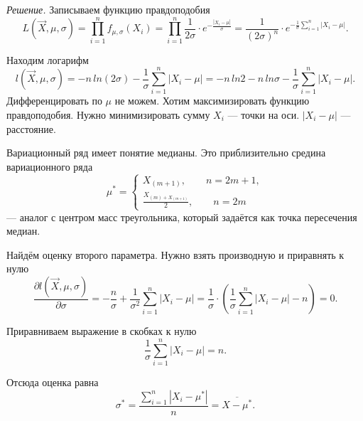 \textit{Решение.} Записываем функцию правдоподобия
$$L \left( \vec{X}, \mu, \sigma \right) =
  \prod \limits_{i = 1}^n f_{ \mu, \sigma } \left( X_i \right) =
  \prod \limits_{i = 1}^n
    \frac{1}{2 \sigma } \cdot e^{- \frac{ \left| X_i - \mu \right| }{ \sigma }} =
  \frac{1}{ \left( 2 \sigma \right)^n} \cdot
  e^{- \frac{1}{ \sigma } \sum \limits_{i = 1}^n \left| X_i - \mu \right| }.$$

Находим логарифм
$$l \left( \vec{X}, \mu, \sigma \right) =
  -n \, ln \left(2 \sigma \right) -
  \frac{1}{ \sigma } \sum \limits_{i = 1}^n \left| X_i - \mu \right| =
  - n \, ln 2 -
  n \, ln \sigma -
  \frac{1}{ \sigma } \sum \limits_{i = 1}^n \left| X_i - \mu \right|.$$
Дифференцировать по $ \mu $ не можем.
Хотим максимизировать функцию правдоподобия.
Нужно минимизировать сумму $X_i$ --- точки на оси.
$ \left| X_i - \mu \right| $ --- расстояние.

Вариационный ряд имеет понятие медианы.
Это приблизительно средина вариационного ряда
$$ \mu^* =
  \begin{cases}
    X_{ \left( m + 1 \right) }, \qquad n = 2m + 1, \\
    \frac{X_{ \left( m \right) + X_{ \left( m + 1 \right) }}}{2}, \qquad n = 2m
  \end{cases}$$
--- аналог с центром масс треугольника, который задаётся как точка пересечения медиан.

Найдём оценку второго параметра.
Нужно взять производную и приравнять к нулю
$$ \frac{ \partial l \left( \vec{X}, \mu, \sigma \right) }{ \partial \sigma } =
  - \frac{n}{ \sigma } + \frac{1}{ \sigma^2} \sum \limits_{i = 1}^n \left| X_i - \mu \right| =
  \frac{1}{ \sigma } \cdot
  \left( \frac{1}{ \sigma } \sum \limits_{i = 1}^n \left| X_i - \mu \right| - n \right) =
  0.$$

Приравниваем выражение в скобках к нулю
$$ \frac{1}{ \sigma } \sum \limits_{i =1}^n \left| X_i - \mu \right| =
  n.$$

Отсюда оценка равна
$$ \sigma^* =
  \frac{ \sum \limits_{i = 1}^n \left| X_i - \mu^* \right| }{n} =
  \overline{X - \mu^*}.$$
